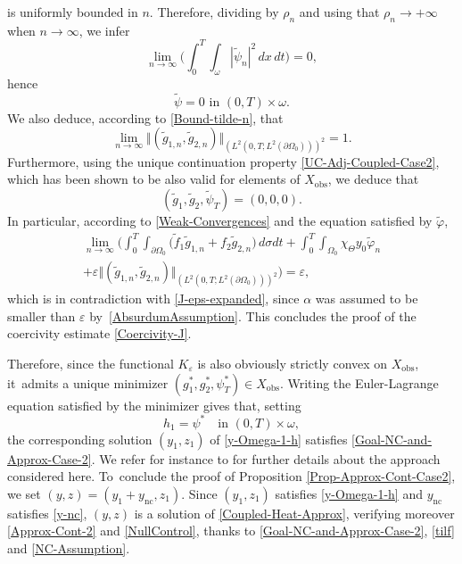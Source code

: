 \documentclass[JEP,XML,SOM,Unicode,NoFloatCountersInSection]{cedram}
\newcommand{\nc}{\mathrm{nc}}
\newcommand{\obs}{\mathrm{obs}}
\newcommand{\norm}[1]{\Vert#1\Vert}
\theoremstyle{definition}
\begin{document}
is uniformly bounded in $n$. Therefore, dividing by $\rho_n$ and using that $\rho_n\to +\infty$ when $n\to \infty$, we infer
\begin{equation*}
\lim_{n \to \infty} \biggl(\int_0^T \int_\omega |\tilde \psi_n|^2 \, dx\,dt \biggr) = 0,
\end{equation*}
hence
\[
\tilde \psi = 0 \text{ in } (0,T) \times \omega.
\]
We also deduce, according to \eqref{Bound-tilde-n}, that
\begin{equation*}
\lim_{n \to \infty} \norm{(\tilde g_{1,n}, \tilde g_{2,n})}_{(L^2(0,T; L^2(\partial\Omega_0)))^2} = 1.
\end{equation*}
Furthermore, using the unique continuation property \eqref{UC-Adj-Coupled-Case2}, which has been shown to be also valid for elements of $X_{\obs}$, we deduce that
\[
(\tilde g_1, \tilde g_2, \tilde \psi_T) = (0,0,0).
\]
In particular, according to \eqref{Weak-Convergences} and the equation satisfied by $\tilde \varphi$,
\begin{multline*}
\lim_{n \to \infty}
\biggl(
\int_0^T \int_{\partial \Omega_0} \bigl(\tilde f_1 \tilde g_{1,n} + f_2 \tilde g_{2,n} \bigr) \, d\sigma dt
+
\int_0^T \int_{\Omega_0} \chi_{\Theta} y_0 \tilde \varphi_n\\[-5pt]
+
\varepsilon
{ \norm{(\tilde g_{1,n}, \tilde g_{2,n})}_{(L^2(0,T; L^2(\partial\Omega_0)))^2}}
\biggr)
=
\varepsilon,
\end{multline*}
which is in contradiction with \eqref{J-eps-expanded}{, since $\alpha$ was assumed to be smaller than $\varepsilon$ by~\eqref{AbsurdumAssumption}}. This concludes the proof of the coercivity estimate \eqref{Coercivity-J}.

Therefore, since the functional $K_\varepsilon$ is also obviously strictly convex on $X_{\obs}$, it~admits a unique minimizer $(g_1^*, g_2^*, \psi_T^*) \in X_{\obs}$. Writing the Euler-Lagrange equation satisfied by the minimizer gives that, setting
\begin{equation*}
h_1 = \psi^* \quad\text{in } (0,T) \times \omega,
\end{equation*}
the corresponding solution $(y_1,z_1)$ of \eqref{y-Omega-1-h} satisfies \eqref{Goal-NC-and-Approx-Case-2}. We refer for instance to \cite[Th.\,1.2 and its proof]{Ervedoza-Note-2020} for further details about the approach considered here. To~conclude the proof of Proposition \ref{Prop-Approx-Cont-Case2}, we set $(y,z)=(y_1+y_{\nc},z_1)$. Since $(y_1,z_1)$ satisfies \eqref{y-Omega-1-h} and $y_{\nc}$ satisfies \eqref{y-nc}, $(y,z)$ is a solution of \eqref{Coupled-Heat-Approx}, verifying moreover \eqref{Approx-Cont-2} and \eqref{NullControl}, thanks to \eqref{Goal-NC-and-Approx-Case-2}, \eqref{tilf} and \eqref{NC-Assumption}.
\end{document}
